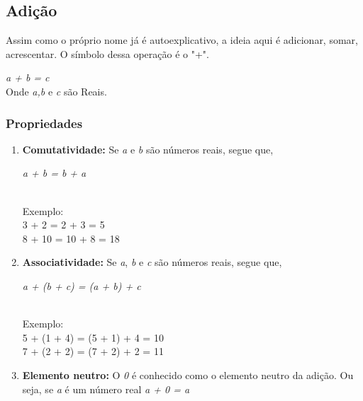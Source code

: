 \documentclass[a4paper, 12pt]{article}
\begin{document}
\subsection{Adição}
Assim como o próprio nome já é autoexplicativo, a ideia aqui é adicionar, somar, acrescentar. O símbolo dessa operação é o "+".\\

\begin{soma}
    \centering \textit{a + b = c}\\
Onde \textit{a,b} e \textit{c} são Reais.
\end{soma}
\subsubsection{Propriedades}
\begin{enumerate}
    \item \textbf{Comutatividade:} Se \textit{a} e \textit{b} são números reais, segue que,\\
    
        \begin{comu} 
            \centering \textit{a + b = b + a}\\
        \end{comu}\\
    
        Exemplo:\\
        3 + 2 = 2 + 3 = 5\\
        8 + 10 = 10 + 8 = 18\\
        
    \item \textbf{Associatividade:} Se \textit{a}, \textit{b} e \textit{c} são números reais, segue que,\\

        \begin{asso} 
            \centering \textit{a + (b + c) = (a + b) + c}\\
        \end{asso}\\

        Exemplo:\\
        5 + (1 + 4) = (5 + 1) + 4 = 10\\
        7 + (2 + 2) = (7 + 2) + 2 = 11\\

    \item \textbf{Elemento neutro:} O \textit{0} é conhecido como o elemento neutro da adição. Ou seja, se \textit{a} é um número real \textit{a + 0 = a}\\
    

\end{enumerate}
\end{document}
